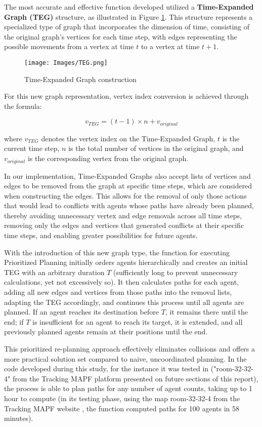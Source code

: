 The most accurate and effective function developed utilized a \textbf{Time-Expanded Graph (TEG)} structure, as illustrated in Figure \ref{TEG}. This structure represents a specialized type of graph that incorporates the dimension of time, consisting of the original graph's vertices for each time step, with edges representing the possible movements from a vertex at time $ t $ to a vertex at time $ t+1 $.

\begin{figure}
    \centering
    \texttt{[image: Images/TEG.png]}
    \caption{Time-Expanded Graph construction}
    \label{TEG}
\end{figure}

For this new graph representation, vertex index conversion is achieved through the formula:

\[ v_{TEG} = (t-1) \times n + v_{original} \tag{12} \]

where $ v_{TEG} $ denotes the vertex index on the Time-Expanded Graph, $ t $ is the current time step, $ n $ is the total number of vertices in the original graph, and $ v_{original} $ is the corresponding vertex from the original graph.

In our implementation, Time-Expanded Graphs also accept lists of vertices and edges to be removed from the graph at specific time steps, which are considered when constructing the edges. This allows for the removal of only those actions that would lead to conflicts with agents whose paths have already been planned, thereby avoiding unnecessary vertex and edge removals across all time steps, removing only the edges and vertices that generated conflicts at their specific time steps, and enabling greater possibilities for future agents.

With the introduction of this new graph type, the function for executing Prioritized Planning initially orders agents hierarchically and creates an initial TEG with an arbitrary duration $ T $ (sufficiently long to prevent unnecessary calculations, yet not excessively so). It then calculates paths for each agent, adding all new edges and vertices from those paths into the removal lists, adapting the TEG accordingly, and continues this process until all agents are planned. If an agent reaches its destination before $ T $, it remains there until the end; if $ T $ is insufficient for an agent to reach its target, it is extended, and all previously planned agents remain at their positions until the end.

This prioritized re-planning approach effectively eliminates collisions and offers a more practical solution set compared to naive, uncoordinated planning. In the code developed during this study, for the instance it was tested in ("room-32-32-4" from the Tracking MAPF platform presented on future sections of this report), the process is able to plan paths for any number of agent counts, taking up to 1 hour to compute (in its testing phase, using the map room-32-32-4 from the Tracking MAPF website \cite{shenTrackingProgressMultiAgent2023}, the function computed paths for 100 agents in 58 minutes).


